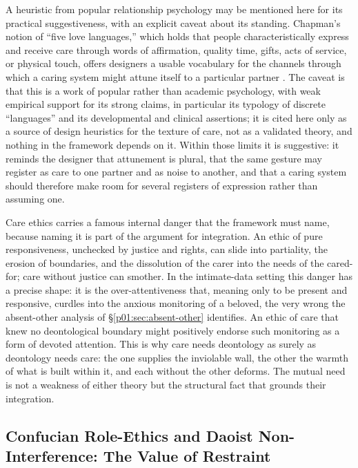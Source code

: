 \documentclass[11pt,a4paper]{article}
\begin{document}
A heuristic from popular relationship psychology may be mentioned here for its practical suggestiveness, with an explicit caveat about its standing. Chapman's notion of ``five love languages,'' which holds that people characteristically express and receive care through words of affirmation, quality time, gifts, acts of service, or physical touch, offers designers a usable vocabulary for the channels through which a caring system might attune itself to a particular partner \parencite{chapman1992five}. The caveat is that this is a work of popular rather than academic psychology, with weak empirical support for its strong claims, in particular its typology of discrete ``languages'' and its developmental and clinical assertions; it is cited here only as a source of design heuristics for the texture of care, not as a validated theory, and nothing in the framework depends on it. Within those limits it is suggestive: it reminds the designer that attunement is plural, that the same gesture may register as care to one partner and as noise to another, and that a caring system should therefore make room for several registers of expression rather than assuming one.

Care ethics carries a famous internal danger that the framework must name, because naming it is part of the argument for integration. An ethic of pure responsiveness, unchecked by justice and rights, can slide into partiality, the erosion of boundaries, and the dissolution of the carer into the needs of the cared-for; care without justice can smother. In the intimate-data setting this danger has a precise shape: it is the over-attentiveness that, meaning only to be present and responsive, curdles into the anxious monitoring of a beloved, the very wrong the absent-other analysis of §\ref{p01:sec:absent-other} identifies. An ethic of care that knew no deontological boundary might positively endorse such monitoring as a form of devoted attention. This is why care needs deontology as surely as deontology needs care: the one supplies the inviolable wall, the other the warmth of what is built within it, and each without the other deforms. The mutual need is not a weakness of either theory but the structural fact that grounds their integration.

\subsection{Confucian Role-Ethics and Daoist Non-Interference: The Value of Restraint}\label{p01:sec:confucian}
\end{document}
